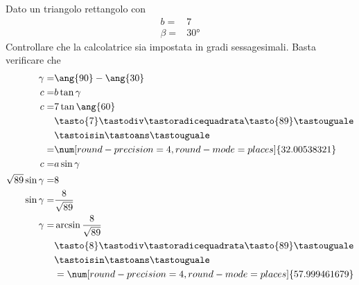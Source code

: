 \begin{exercise}
	Dato un triangolo rettangolo con
	\begin{align*}
	b=&7\\
	\beta=&\ang{30}
	\end{align*}
	\tcblower
	Controllare che la calcolatrice sia impostata in gradi sessagesimali.
	Basta verificare che \testgradi 
	\begin{align*}
	\gamma=&\ang{90}-\ang{30}\\
	c=&b\tan\gamma\\
	c=&7\tan\ang{60}\\
	&\tasto{7}\tastodiv\tastoradicequadrata\tasto{89}\tastouguale\\
	&\tastoisin\tastoans\tastouguale\\
	=&\num[round-precision=\lungarrotandamento,round-mode=places]{32.00538321}\\
	c=&a\sin\gamma\\
	\sqrt{89}\sin\gamma=&8\\
	\sin\gamma=&\frac{8}{\sqrt{89}}\\
	\gamma=&\arcsin\frac{8}{\sqrt{89}}\\
	&\tasto{8}\tastodiv\tastoradicequadrata\tasto{89}\tastouguale\\
	&\tastoisin\tastoans\tastouguale\\
	&=\num[round-precision=\lungarrotandamento,round-mode=places]{57.999461679}\\
	\end{align*}
\end{exercise}
